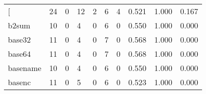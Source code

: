 \begin{longtable}{lp{2.0cm}p{2.0cm}p{2.0cm}p{2.0cm}p{2.0cm}p{2.0cm}p{2.0cm}p{2.0cm}p{2.0cm}}
\bottomrule
\endlastfoot
{[}         &                     24 &                                             0 &                                           12 &                                           2 &                                            6 &                                          4 &                                0.521 &                                  1.000 &                                0.167 \\
b2sum     &                     10 &                                             0 &                                            4 &                                           0 &                                            6 &                                          0 &                                0.550 &                                  1.000 &                                0.000 \\
base32    &                     11 &                                             0 &                                            4 &                                           0 &                                            7 &                                          0 &                                0.568 &                                  1.000 &                                0.000 \\
base64    &                     11 &                                             0 &                                            4 &                                           0 &                                            7 &                                          0 &                                0.568 &                                  1.000 &                                0.000 \\
basename  &                     10 &                                             0 &                                            4 &                                           0 &                                            6 &                                          0 &                                0.550 &                                  1.000 &                                0.000 \\
basenc    &                     11 &                                             0 &                                            5 &                                           0 &                                            6 &                                          0 &                                0.523 &                                  1.000 &                                0.000 \\

\end{longtable}
